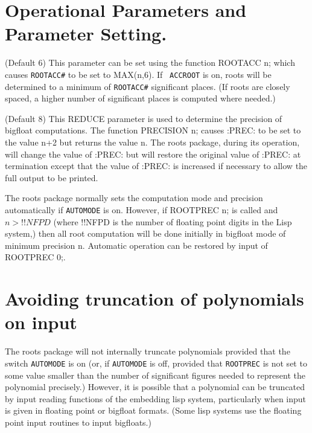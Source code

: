 \section{Operational Parameters and Parameter Setting.}

\begin{description}                 
\item[ROOTACC\#] (Default 6) This parameter can be set using the function
ROOTACC n; which causes {\tt ROOTACC\#} to be set to MAX(n,6).  If {\tt
ACCROOT} is on, roots will be determined to a minimum of {\tt ROOT\-ACC\#}
significant places. (If roots are closely spaced, a higher number of
significant places is computed where needed.)

\item[:PREC:] (Default 8) This REDUCE parameter is used to determine the
precision of bigfloat computations.  The function PRECISION n; causes
:PREC: to be set to the value n+2 but returns the value n.  The roots
package, during its operation, will change the value of :PREC: but will
restore the original value of :PREC: at termination except that the
value of :PREC: is increased if necessary to allow the full output to be
printed.

\item[ROOTPREC n;] The roots package normally sets the computation mode and
precision automatically if {\tt AUTOMODE} is on.  However, if ROOTPREC n; is
called and $n>!!NFPD$  (where !!NFPD is the number of floating point
digits in the Lisp system,) then all root computation will be done
initially in bigfloat mode of minimum precision n.  Automatic operation
can be restored by input of ROOTPREC 0;.
\end{description}


\section{Avoiding truncation of polynomials on input}

The roots package will not internally truncate polynomials provided that the
switch {\tt AUTOMODE} is on (or, if {\tt AUTOMODE} is off, provided that
{\tt ROOTPREC} is not set to some value smaller than the number of
significant figures needed to represent the polynomial precisely.) However,
it is possible that a polynomial can be truncated by input reading functions
of the embedding lisp system, particularly when input is given in floating
point or bigfloat formats. (Some lisp systems use the floating point input
routines to input bigfloats.)

